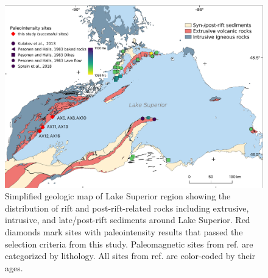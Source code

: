 \documentclass[9pt,twocolumn,twoside,lineno]{pnas-new}
\begin{document}
\begin{figure}
\centering
\noindent\includegraphics[width=11.4 cm]{Geologic_map.pdf}
\caption{\footnotesize{Simplified geologic map of Lake Superior region showing the distribution of rift and post-rift-related rocks including extrusive, intrusive, and late/post-rift sediments around Lake Superior. Red diamonds mark sites with paleointensity results that passed the selection criteria from this study. Paleomagnetic sites from ref. \citealp{Pesonen1983a} are categorized by lithology. All sites from ref. \citealp{Pesonen1983a, Kulakov2013a, Sprain2018a} are color-coded by their ages.}}
\label{fig:Geologic_map}
\end{figure}

\end{document}

